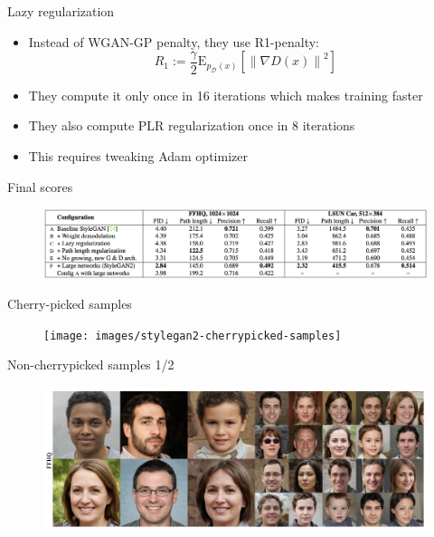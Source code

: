 \documentclass[handout, 10pt]{beamer}
\begin{document}
\begin{frame}{Lazy regularization}
\begin{itemize}
    \item\pause Instead of WGAN-GP penalty, they use R1-penalty:
\begin{equation}
R_{1}:=\frac{\gamma}{2} \mathrm{E}_{p_{\mathcal{D}}(x)}\left[\left\|\nabla D(x)\right\|^{2}\right]
\end{equation}
    \item\pause They compute it only once in 16 iterations which makes training faster
    \item\pause They also compute PLR regularization once in 8 iterations
    \item\pause This requires tweaking Adam optimizer
\end{itemize}
\end{frame}



\begin{frame}{Final scores}
\begin{figure}
\centering
\includegraphics[width=\textwidth]{images/stylegan2-scores}
\end{figure}    
\end{frame}


\begin{frame}{Cherry-picked samples}
\begin{figure}
\centering
\texttt{[image: images/stylegan2-cherrypicked-samples]}
\end{figure}
\end{frame}


\begin{frame}{Non-cherrypicked samples 1/2}
\begin{figure}
\centering
\includegraphics[width=\textwidth]{images/stylegan2-samples-1}
\end{figure}
\end{frame}
\end{document}
